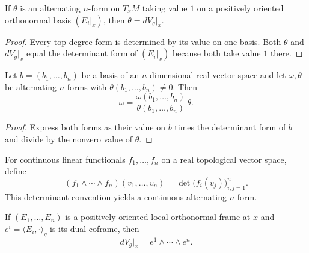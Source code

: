 \begin{proposition}[Uniqueness of $dV_g$]
\label{prop:volume-form-uniqueness}





If $\theta$ is an alternating $n$-form on $T_xM$ taking value $1$ on a positively oriented orthonormal basis $(E_i|_x)$, then $\theta=dV_g|_x$.
\end{proposition}

\begin{proof}

\sketch Every top-degree form is determined by its value on one basis. Both $\theta$ and $dV_g|_x$ equal the determinant form of $(E_i|_x)$ because both take value $1$ there.
\end{proof}

\begin{lemma}
\label{lem:top-forms-proportional}




Let $b=(b_1,\ldots,b_n)$ be a basis of an $n$-dimensional real vector space and let $\omega,\theta$ be alternating $n$-forms with $\theta(b_1,\ldots,b_n)\ne0$. Then
\[
\omega=\frac{\omega(b_1,\ldots,b_n)}{\theta(b_1,\ldots,b_n)}\,\theta.
\]
\end{lemma}

\begin{proof}

\sketch Express both forms as their value on $b$ times the determinant form of $b$ and divide by the nonzero value of $\theta$.
\end{proof}

\begin{definition}
\label{def:wedge-covectors}




For continuous linear functionals $f_1,\ldots,f_n$ on a real topological vector space, define
\[
(f_1\wedge\cdots\wedge f_n)(v_1,\ldots,v_n)=\det\bigl(f_i(v_j)\bigr)_{i,j=1}^n.
\]
This determinant convention yields a continuous alternating $n$-form.
\end{definition}

\begin{proposition}
\label{prop:volume-form-coframe}





If $(E_1,\ldots,E_n)$ is a positively oriented local orthonormal frame at $x$ and $e^i=\langle E_i,\cdot\rangle_g$ is its dual coframe, then
\[
dV_g|_x=e^1\wedge\cdots\wedge e^n.
\]
\end{proposition}

